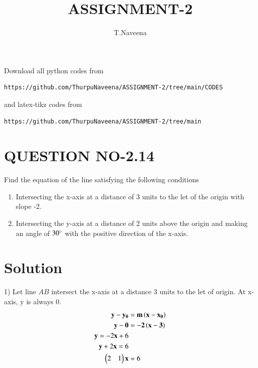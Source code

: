 \documentclass[journal,12pt,twocolumn]{IEEEtran}
\begin{document}
     \def\rightbox#1{\makebox[0in][r]{#1}}
     \def\centbox#1{\makebox[0in]{#1}}
     \def\topbox#1{\raisebox{-\baselineskip}[0in][0in]{#1}}
     \def\midbox#1{\raisebox{-0.5\baselineskip}[0in][0in]{#1}}
\vspace{3cm}
\title{ASSIGNMENT-2}
\author{T.Naveena}
\maketitle
\newpage
\bigskip
\renewcommand{\thefigure}{\theenumi}
\renewcommand{\thetable}{\theenumi}
Download all python codes from 
\begin{lstlisting}
https://github.com/ThurpuNaveena/ASSIGNMENT-2/tree/main/CODES
\end{lstlisting}
%
and latex-tikz codes from 
%
\begin{lstlisting}
https://github.com/ThurpuNaveena/ASSIGNMENT-2/tree/main
\end{lstlisting}
%
\section{QUESTION NO-2.14}
Find the equation of the line satisfying the following conditions
\begin{enumerate}
\item Intersecting the x-axis at a distance of 3 units to the let of the origin with slope -2.
\item Intersecting the y-axis at a distance of 2 units above the origin and making an angle of $30\degree$ with the positive direction of the x-axis.
\end{enumerate}
%

%
\section{Solution}
1) Let line $AB$ intersect the x-axis at a distance 3 units to the let of origin.
At x-axis, y is always 0.
\begin{align}
\label{eq:line_norm_dir}
\mathbf{y}-\mathbf{y_0} &= \mathbf{m}\left(\mathbf{x}-\mathbf{x_0}\right)
\\
\mathbf{y}-\mathbf{0} &= \mathbf{-2}\left(\mathbf{x}-\mathbf{3}\right)
\\
\mathbf{y} = -2\mathbf{x}+6
\\
\mathbf{y}+2\mathbf{x} = 6
\\
\begin{pmatrix}2 & 1\end{pmatrix}\mathbf{x} &= 6
\end{align}
\end{document}
